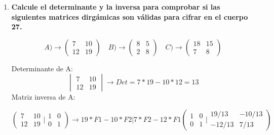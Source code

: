 \documentclass{article}
\begin{document}
\begin{enumerate}

\item \textbf{Calcule el determinante y la inversa para comprobar si las siguientes matrices dirgámicas son válidas para cifrar en el cuerpo 27.}

\begin{equation*}
    A) \rightarrow \left(
    \begin{array}{cc}
    7 & 10 \\
    12 & 19
    \end{array}
    \right) \quad B) \rightarrow \left(
    \begin{array}{cc}
    8 & 5 \\
    2 & 8
    \end{array}
    \right)\quad  C) \rightarrow \left(
    \begin{array}{cc}
    18 & 15 \\
    7 & 8
    \end{array}
    \right) 
\end{equation*}


Determinante de A:
\begin{equation*}
    \begin{vmatrix}
    7 & 10 \\
    12 & 19
    \end{vmatrix} \rightarrow Det=
    7*19 - 10*12 = 13
\end{equation*}
Matriz inversa de A:

\begin{equation*}\left(
    \begin{array}{cc}
    7 & 10 \\
    12 & 19
    \end{array} \bigg\vert  \begin{array}{cc}
    1 & 0 \\
    0 & 1
    \end{array}  \right)
     \rightarrow  19*F1-10*F2 \vert 7*F2-12*F1
     \left(
    \begin{array}{cc}
    1 & 0 \\
    0 & 1
    \end{array}\bigg\vert  \begin{array}{cc}
    19/13 & -10/13 \\
    -12/13 & 7/13
    \end{array}
    \right) 
\end{equation*}




\end{enumerate}
\end{document}
